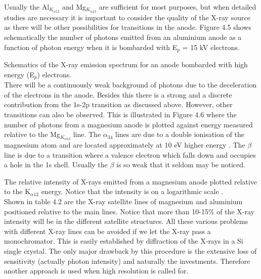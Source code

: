              Usually the Al$_{K_{\alpha 12}}$ and Mg$_{K_{\alpha 12}}$
          are sufficient for most purposes, but when detailed studies
          are necessary it is important to consider the quality of the
          X-ray source as there will be other possibilities for
          transitions in the anode. Figure 4.5 shows schematically the
          number of photons emitted from an aluminium anode as a
          function of photon energy when it is bombarded with E$_{p}$
          = 15 kV electrons.\\

\vspace{16cm}

          Schematics of the X-ray emission
        spectrum for an anode bombarded with high energy (E$_{p}$)
       electrons.\\


             There will be a continuously weak background of photons
          due to the deceleration of the electrons in the anode.
          Besides this there is a strong and a discrete contribution
          from the 1s-2p transition as discussed above. However, other
          transitions can also be observed. This is illustrated in
          Figure 4.6 where the number of photons from a magnesium
          anode is plotted against energy measured relative to the
          Mg$_{K_{\alpha 12}}$ line. The $\alpha_{34}$ lines are due
          to a double ionisation of the magnesium atom and are located
          approximately at 10 eV higher energy \cite{krause}. The
          $\beta$ line is due to a transition where  a valence
          electron which falls down and occupies a hole in the
          1s shell. Usually the $\beta$ is so weak that it seldom may
          be noticed.\\

\vspace{12cm}


 The relative intensity of X-rays emitted
          from a magnesium anode plotted relative to the K$_{\alpha
          12}$ energy. Notice that the intensity is on a logarithmic
          scale \cite{krause}.\\

             Shown in table 4.2 are the X-ray satellite lines of
          magnesium and aluminium positioned relative to the main lines.
          Notice that more than 10-15\% of the X-ray intensity will be
          in the different satellite structures. All these various
          problems with different X-ray lines can be avoided if we let
          the X-ray pass a monochromator. This is easily established
          by diffraction of the X-rays in a Si single crystal. The
          only major drawback by this procedure is the extensive loss
          of sensitivity (actually photon intensity) and naturally the
          investments. Therefore another approach is used when high
          resolution is called for.\\

